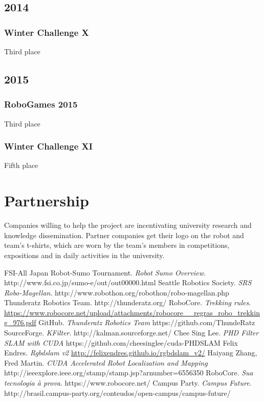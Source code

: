 \documentclass[conference]{IEEEtran}
\begin{document}
\subsection*{2014}
\setcounter{subsubsection}{0}
\subsubsection{Winter Challenge X} Third place
\subsection*{2015}
\setcounter{subsubsection}{0}
\subsubsection{RoboGames 2015} Third place
\subsubsection{Winter Challenge XI} Fifth place

\section{Partnership}
Companies willing to help the project are incentivating university research and
knowledge dissemination. Partner companies get their logo on the robot and team's
t-shirts, which are worn by the team's members in competitions, expositions
and in daily activities in the university.



\begin{thebibliography}{30}
    FSI-All Japan Robot-Sumo Tournament. \emph{Robot Sumo Overview}. http://www.fsi.co.jp/sumo-e/out/out00000.html
    Seattle Robotics Society. \emph{SRS Robo-Magellan}. http://www.robothon.org/robothon/robo-magellan.php
    Thunderatz Robotics Team. http://thunderatz.org/
    RoboCore. \emph{Trekking rules}. \url{https://www.robocore.net/upload/attachments/robocore__regras_robo_trekking_976.pdf}
    GitHub. \emph{Thunderatz Robotics Team} https://github.com/ThundeRatz
    SourceForge. \emph{KFilter}. http://kalman.sourceforge.net/
    Chee Sing Lee. \emph{PHD Filter SLAM with CUDA} https://github.com/cheesinglee/cuda-PHDSLAM
    Felix Endres. \emph{Rgbdslam v2} \url{http://felixendres.github.io/rgbdslam_v2/}
    Haiyang Zhang, Fred Martin. \emph{CUDA Accelerated Robot Localization and Mapping}
    http://ieeexplore.ieee.org/stamp/stamp.jsp?arnumber=6556350
    RoboCore. \emph{Sua tecnologia à prova}. https://www.robocore.net/
    Campus Party. \emph{Campus Future}. http://brasil.campus-party.org/conteudos/open-campus/campus-future/
\end{thebibliography}
\end{document}
